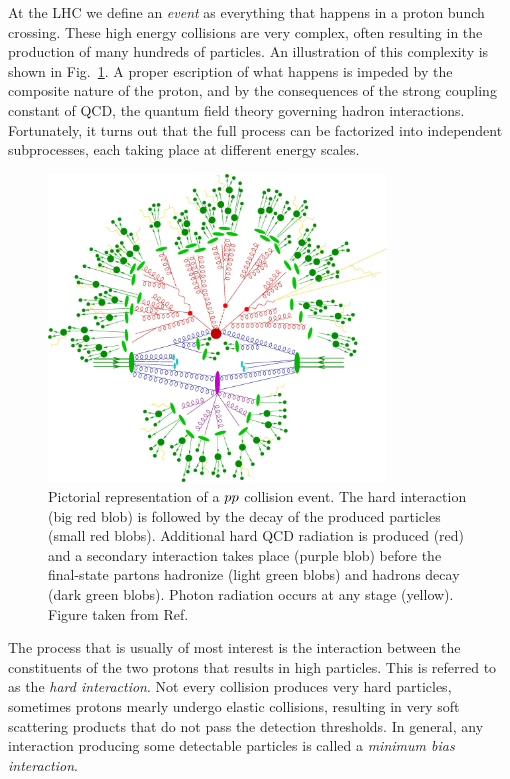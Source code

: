 

At the LHC we define an \textit{event} as everything that happens in a proton bunch crossing.
These high energy collisions are very complex, often resulting in the production of many hundreds of
particles. An illustration of this complexity is shown in Fig.~\ref{fig:event_full_event}.
A proper escription of what happens is impeded by the composite nature of the proton, and by the
consequences of the strong coupling constant of QCD, the quantum field theory governing hadron
interactions.
Fortunately, it turns out that the full process can be factorized into independent subprocesses,
each taking place at different energy scales. 


\begin{figure}[htpb]
  \centering
  \includegraphics[width=0.8\textwidth]{figures/eventreco_event/full_event}
  \caption{Pictorial representation of a ${p}{p}$ collision event.
The hard interaction (big red blob) is followed by the decay of the produced particles (small red
blobs).
Additional hard QCD radiation is produced (red) and a secondary interaction takes place (purple
blob) before the final-state partons hadronize (light green blobs) and hadrons decay (dark green
blobs). Photon radiation occurs at any stage (yellow). Figure taken from
Ref.~\cite{Gleisberg:2008ta}
  \label{fig:event_full_event}}
\end{figure}


The process that is usually of most interest is the interaction between the constituents of the two
protons that results in high \pt particles. This is referred to as the \textit{hard interaction}. 
Not every collision produces very hard particles, sometimes protons mearly undergo elastic
collisions, resulting in very soft scattering products that do not pass the detection thresholds. In
general, any interaction producing some detectable particles is called a \textit{minimum bias
interaction}. 

